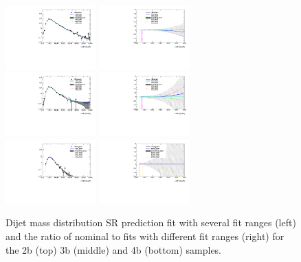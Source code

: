 \begin{figure}[htbp!]
\begin{center}
\includegraphics[width=0.31\textwidth,angle=-90]{figures/boosted/Syst_Smooth/smoothFuncRangeCompare_22_comp.pdf}
\includegraphics[width=0.31\textwidth,angle=-90]{figures/boosted/Syst_Smooth/smoothFuncRangeCompare_22_comp_ratio.pdf} \\
\includegraphics[width=0.31\textwidth,angle=-90]{figures/boosted/Syst_Smooth/smoothFuncRangeCompare_33_comp.pdf}
\includegraphics[width=0.31\textwidth,angle=-90]{figures/boosted/Syst_Smooth/smoothFuncRangeCompare_33_comp_ratio.pdf} \\
\includegraphics[width=0.31\textwidth,angle=-90]{figures/boosted/Syst_Smooth/smoothFuncRangeCompare_44_comp.pdf}
\includegraphics[width=0.31\textwidth,angle=-90]{figures/boosted/Syst_Smooth/smoothFuncRangeCompare_44_comp_ratio.pdf} \\
\caption{Dijet mass distribution SR prediction fit with several fit ranges (left) and the ratio of nominal to fits with different fit ranges (right)  for the 2b (top) 3b (middle) and 4b (bottom) samples. }
\label{fig:qcd_fit_range_sys_ratio-scaled}
\end{center}
\end{figure}

